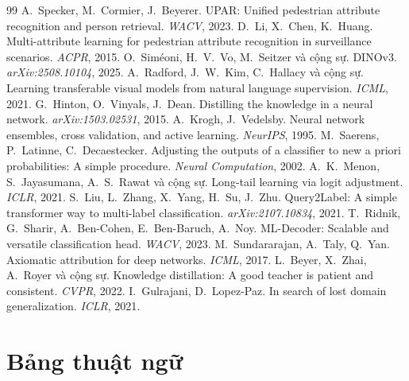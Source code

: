 \documentclass[11pt,a4paper]{article}
\begin{document}
\begin{thebibliography}{99}\small
{} A.~Specker, M.~Cormier, J.~Beyerer. UPAR: Unified pedestrian attribute recognition and person retrieval. \textit{WACV}, 2023.
 D.~Li, X.~Chen, K.~Huang. Multi-attribute learning for pedestrian attribute recognition in surveillance scenarios. \textit{ACPR}, 2015.
 O.~Siméoni, H.~V.~Vo, M.~Seitzer và cộng sự. DINOv3. \textit{arXiv:2508.10104}, 2025.
 A.~Radford, J.~W.~Kim, C.~Hallacy và cộng sự. Learning transferable visual models from natural language supervision. \textit{ICML}, 2021.
 G.~Hinton, O.~Vinyals, J.~Dean. Distilling the knowledge in a neural network. \textit{arXiv:1503.02531}, 2015.
 A.~Krogh, J.~Vedelsby. Neural network ensembles, cross validation, and active learning. \textit{NeurIPS}, 1995.
 M.~Saerens, P.~Latinne, C.~Decaestecker. Adjusting the outputs of a classifier to new a priori probabilities: A simple procedure. \textit{Neural Computation}, 2002.
 A.~K.~Menon, S.~Jayasumana, A.~S.~Rawat và cộng sự. Long-tail learning via logit adjustment. \textit{ICLR}, 2021.
 S.~Liu, L.~Zhang, X.~Yang, H.~Su, J.~Zhu. Query2Label: A simple transformer way to multi-label classification. \textit{arXiv:2107.10834}, 2021.
 T.~Ridnik, G.~Sharir, A.~Ben-Cohen, E.~Ben-Baruch, A.~Noy. ML-Decoder: Scalable and versatile classification head. \textit{WACV}, 2023.
 M.~Sundararajan, A.~Taly, Q.~Yan. Axiomatic attribution for deep networks. \textit{ICML}, 2017.
 L.~Beyer, X.~Zhai, A.~Royer và cộng sự. Knowledge distillation: A good teacher is patient and consistent. \textit{CVPR}, 2022.
 I.~Gulrajani, D.~Lopez-Paz. In search of lost domain generalization. \textit{ICLR}, 2021.
\end{thebibliography}

\appendix

\section{Bảng thuật ngữ}
\label{app:glossary}
\end{document}

